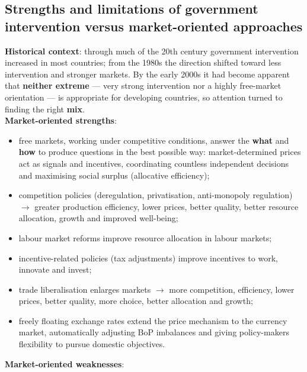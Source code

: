 \documentclass[a4paper,12pt]{article}
\begin{document}
\subsection{Strengths and limitations of government intervention versus market-oriented approaches}
\textbf{Historical context}: through much of the 20th century government intervention increased in most countries; from the 1980s the direction shifted toward less intervention and stronger markets. By the early 2000s it had become apparent that \textbf{neither extreme} --- very strong intervention nor a highly free-market orientation --- is appropriate for developing countries, so attention turned to finding the right \textbf{mix}.
\\
\textbf{Market-oriented strengths}:
\begin{itemize}
  \item free markets, working under competitive conditions, answer the \textbf{what} and \textbf{how} to produce questions in the best possible way: market-determined prices act as signals and incentives, coordinating countless independent decisions and maximising social surplus (allocative efficiency);
  \item competition policies (deregulation, privatisation, anti-monopoly regulation) $\to$ greater production efficiency, lower prices, better quality, better resource allocation, growth and improved well-being;
  \item labour market reforms improve resource allocation in labour markets;
  \item incentive-related policies (tax adjustments) improve incentives to work, innovate and invest;
  \item trade liberalisation enlarges markets $\to$ more competition, efficiency, lower prices, better quality, more choice, better allocation and growth;
  \item freely floating exchange rates extend the price mechanism to the currency market, automatically adjusting BoP imbalances and giving policy-makers flexibility to pursue domestic objectives.
\end{itemize}
\textbf{Market-oriented weaknesses}:
\end{document}
